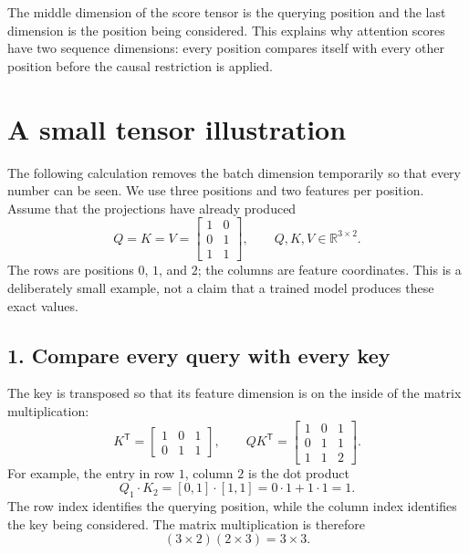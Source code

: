 \documentclass[11pt]{article}
\begin{document}
The middle dimension of the score tensor is the querying position and the last
dimension is the position being considered. This explains why attention scores
have two sequence dimensions: every position compares itself with every other
position before the causal restriction is applied.

\section{A small tensor illustration}
The following calculation removes the batch dimension temporarily so that every
number can be seen. We use three positions and two features per position. Assume
that the projections have already produced
\[
Q=K=V=
\begin{bmatrix}
1&0\\
0&1\\
1&1
\end{bmatrix},
\qquad Q,K,V\in\mathbb{R}^{3\times2}.
\]
The rows are positions $0$, $1$, and $2$; the columns are feature coordinates.
This is a deliberately small example, not a claim that a trained model produces
these exact values.

\subsection{1. Compare every query with every key}
The key is transposed so that its feature dimension is on the inside of the
matrix multiplication:
\[
K^\mathsf{T}=
\begin{bmatrix}
1&0&1\\
0&1&1
\end{bmatrix},
\qquad
QK^\mathsf{T}
=
\begin{bmatrix}
1&0&1\\
0&1&1\\
1&1&2
\end{bmatrix}.
\]
For example, the entry in row $1$, column $2$ is the dot product
\[
Q_1\cdot K_2=[0,1]\cdot[1,1]=0\cdot1+1\cdot1=1.
\]
The row index identifies the querying position, while the column index identifies
the key being considered. The matrix multiplication is therefore
\[
(3\times2)(2\times3)=3\times3.
\]
\end{document}
